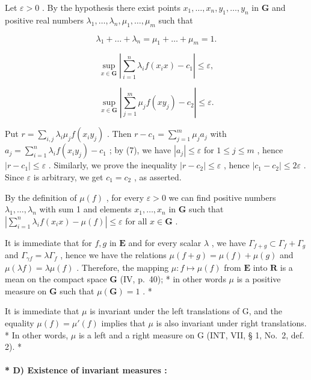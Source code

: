 Let \(\varepsilon > 0\) . By the hypothesis there exist points \(x_{1}, \ldots, x_{n}, y_{1}, \ldots, y_{n}\) in \(\mathbf{G}\) and positive real numbers \(\lambda_{1}, \ldots, \lambda_{n}, \mu_{1}, \ldots, \mu_{m}\) such that

\[
\lambda_ {1} + \dots + \lambda_ {n} = \mu_ {1} + \dots + \mu_ {m} = 1.\tag{6}
\]

\[
\sup _ {x \in \mathbf {G}} \left| \sum_ {i = 1} ^ {n} \lambda_ {i} f (x _ {i} x) - c _ {1} \right| \leqslant \varepsilon ,\tag{7}
\]

\[
\sup _ {x \in \mathbf {G}} \left| \sum_ {j = 1} ^ {m} \mu_ {j} f (x y _ {j}) - c _ {2} \right| \leqslant \varepsilon .\tag{8}
\]

Put \(r = \sum_{i,j} \lambda_i \mu_j f(x_i y_j)\) . Then \(r - c_1 = \sum_{j=1}^{m} \mu_j a_j\) with \(a_j = \sum_{i=1}^{n} \lambda_i f(x_i y_j) - c_1\) ; by (7), we have \(|a_j| \leqslant \varepsilon\) for \(1 \leqslant j \leqslant m\) , hence \(|r - c_1| \leqslant \varepsilon\) . Similarly, we prove the inequality \(|r - c_2| \leqslant \varepsilon\) , hence \(|c_1 - c_2| \leqslant 2\varepsilon\) . Since \(\varepsilon\) is arbitrary, we get \(c_1 = c_2\) , as asserted.

By the definition of \(\mu(f)\) , for every \(\varepsilon > 0\) we can find positive numbers \(\lambda_1, \ldots, \lambda_n\) with sum 1 and elements \(x_1, \ldots, x_n\) in \(\mathbf{G}\) such that \(\left|\sum_{i=1}^{n} \lambda_i f(x_i x) - \mu(f)\right| \leqslant \varepsilon\) for all \(x \in \mathbf{G}\) .

It is immediate that for \(f, g\) in \(\mathbf{E}\) and for every scalar \(\lambda\) , we have \(\Gamma_{f + g} \subset \Gamma_f + \Gamma_g\) and \(\Gamma_{\gamma f} = \lambda \Gamma_f\) , hence we have the relations \(\mu(f + g) = \mu(f) + \mu(g)\) and \(\mu(\lambda f) = \lambda \mu(f)\) . Therefore, the mapping \(\mu : f \mapsto \mu(f)\) from \(\mathbf{E}\) into \(\mathbf{R}\) is a mean on the compact space \(\mathbf{G}\) (IV, p.~40); * in other words \(\mu\) is a positive measure on \(\mathbf{G}\) such that \(\mu(\mathbf{G}) = 1\) . *

It is immediate that \(\mu\) is invariant under the left translations of G, and the equality \(\mu(f) = \mu'(f)\) implies that \(\mu\) is also invariant under right translations. * In other words, \(\mu\) is a left and a right measure on G (INT, VII, § 1, No.~2, def. 2). *

\paragraph{* D) Existence of invariant measures :}

